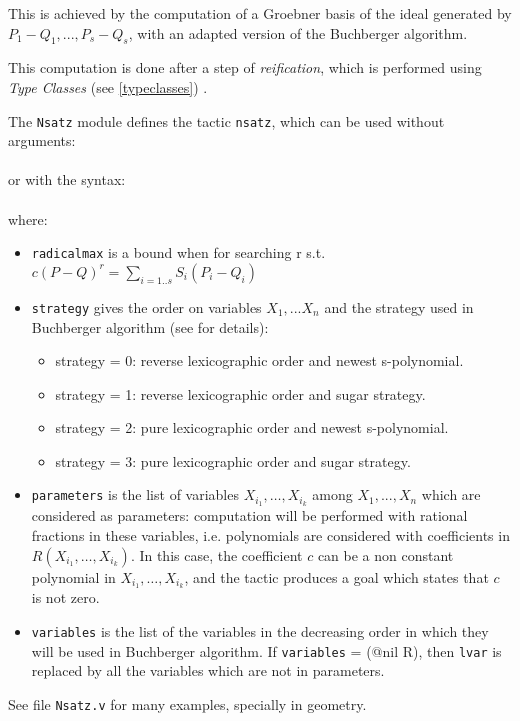 This is achieved by the computation of a Groebner basis of the
ideal generated by $P_1-Q_1,...,P_s-Q_s$, with an adapted version of the Buchberger
algorithm.

This computation is done after a step of {\em reification}, which is
performed using {\em Type Classes} 
(see \ref{typeclasses})
.

The \texttt{Nsatz} module defines the tactic
\texttt{nsatz}, which can be used without arguments: \\
\vspace*{3mm}
\\
or with the syntax: \\
\vspace*{3mm}
\\
where:

\begin{itemize}
    \item \texttt{radicalmax} is a bound when for searching r s.t.$c (P-Q)^r =
\sum_{i=1..s} S_i (P_i - Q_i)$
	
    \item \texttt{strategy} gives the order on variables $X_1,...X_n$ and
the strategy used in Buchberger algorithm (see
\cite{sugar} for details): 

     	\begin{itemize}
		\item  strategy = 0: reverse lexicographic order and newest s-polynomial.
		\item   strategy = 1: reverse lexicographic order and sugar strategy.
	        \item  strategy = 2: pure lexicographic order and newest s-polynomial.
	        \item   strategy = 3: pure lexicographic order and sugar strategy.
	\end{itemize}

	\item \texttt{parameters} is the list of variables
$X_{i_1},\ldots,X_{i_k}$  among $X_1,...,X_n$ which are considered as
   parameters: computation will be performed with rational fractions in these
   variables, i.e. polynomials are considered with coefficients in
$R(X_{i_1},\ldots,X_{i_k})$. In this case, the coefficient $c$ can be a non
constant polynomial in $X_{i_1},\ldots,X_{i_k}$, and the tactic produces a goal
which states that $c$ is not zero.

	\item \texttt{variables} is the list of the variables
in the decreasing order in which they will be used in Buchberger algorithm. If \texttt{variables} = {(@nil
R)}, then \texttt{lvar} is replaced by all the variables which are not in
parameters.

\end{itemize}

See file \texttt{Nsatz.v} for many examples, specially in geometry.

